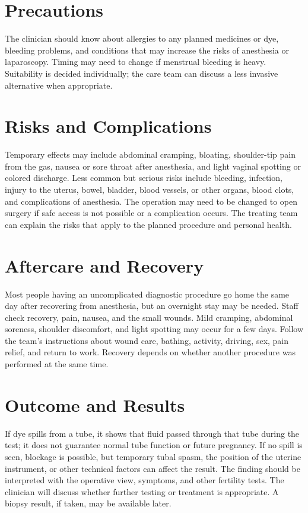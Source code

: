 \section*{Precautions}
The clinician should know about allergies to any planned medicines or dye, bleeding problems, and conditions that may increase the risks of anesthesia or laparoscopy. Timing may need to change if menstrual bleeding is heavy. Suitability is decided individually; the care team can discuss a less invasive alternative when appropriate.

\section*{Risks and Complications}
Temporary effects may include abdominal cramping, bloating, shoulder-tip pain from the gas, nausea or sore throat after anesthesia, and light vaginal spotting or colored discharge. Less common but serious risks include bleeding, infection, injury to the uterus, bowel, bladder, blood vessels, or other organs, blood clots, and complications of anesthesia. The operation may need to be changed to open surgery if safe access is not possible or a complication occurs. The treating team can explain the risks that apply to the planned procedure and personal health.

\section*{Aftercare and Recovery}
Most people having an uncomplicated diagnostic procedure go home the same day after recovering from anesthesia, but an overnight stay may be needed. Staff check recovery, pain, nausea, and the small wounds. Mild cramping, abdominal soreness, shoulder discomfort, and light spotting may occur for a few days. Follow the team's instructions about wound care, bathing, activity, driving, sex, pain relief, and return to work. Recovery depends on whether another procedure was performed at the same time.

\section*{Outcome and Results}
If dye spills from a tube, it shows that fluid passed through that tube during the test; it does not guarantee normal tube function or future pregnancy. If no spill is seen, blockage is possible, but temporary tubal spasm, the position of the uterine instrument, or other technical factors can affect the result. The finding should be interpreted with the operative view, symptoms, and other fertility tests. The clinician will discuss whether further testing or treatment is appropriate. A biopsy result, if taken, may be available later.

